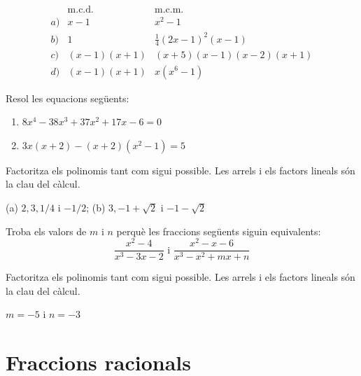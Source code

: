 \begin{solucio}
\[
\begin{array}{lll}
& \text{m.c.d.} & \text{m.c.m.} \\
a) & x-1 & x^{2}-1 \\
b) & 1 & \frac{1}{4}(2x-1)^{2}(x-1) \\
c) & (x-1)(x+1) & \left( x+5\right) \left( x-1\right) \left( x-2\right)
\left( x+1\right) \\
d) & (x-1)(x+1) & x(x^{6}-1)
\end{array}
\]
\end{solucio}

\begin{exercici}
Resol les equacions següents:

\begin{enumerate}
\item[a)] $8x^{4}-38x^{3}+37x^{2}+17x-6=0$

\item[b)] $3x(x+2)-(x+2)(x^{2}-1)=5$
\end{enumerate}
\end{exercici}
\begin{indicacio}
Factoritza els polinomis tant com sigui possible. Les arrels i els factors lineals són la clau del càlcul.
\end{indicacio}

\begin{solucio}
(a) $2,3,1/4$ i $-1/2$; (b) $3,-1+\sqrt{2}$ i $-1-\sqrt{2}$
\end{solucio}

\begin{exercici}
Troba els valors de $m$ i $n$ perquè les fraccions següents siguin
equivalents:
\[
\frac{x^{2}-4}{x^{3}-3x-2}\text{ \ \ \ \ i \ \ \ \ }\frac{x^{2}-x-6}{
x^{3}-x^{2}+mx+n}
\]
\end{exercici}
\begin{indicacio}
Factoritza els polinomis tant com sigui possible. Les arrels i els factors lineals són la clau del càlcul.
\end{indicacio}

\begin{solucio}
$m=-5$ i $n=-3$
\end{solucio}

\section{Fraccions racionals}

